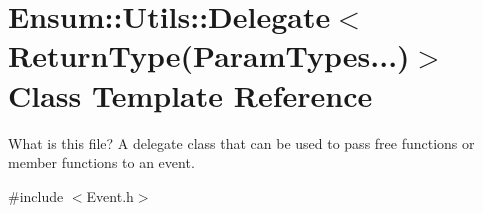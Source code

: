 \hypertarget{class_ensum_1_1_utils_1_1_delegate_3_01_return_type_07_param_types_8_8_8_08_4}{}\section{Ensum\+:\+:Utils\+:\+:Delegate$<$ Return\+Type(Param\+Types...)$>$ Class Template Reference}
\label{class_ensum_1_1_utils_1_1_delegate_3_01_return_type_07_param_types_8_8_8_08_4}


What is this file? A delegate class that can be used to pass free functions or member functions to an event.  




{\ttfamily \#include $<$Event.\+h$>$}

